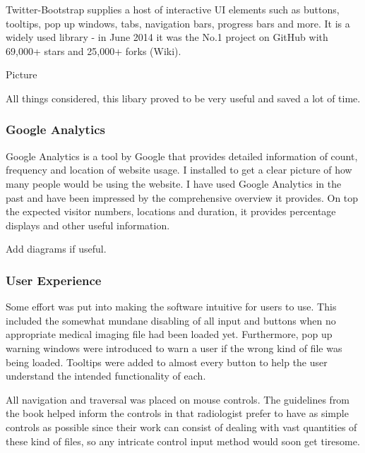 \documentclass[a4paper,11pt,titlepage]{article}
\begin{document}
Twitter-Bootstrap supplies a host of interactive UI elements such as buttons, tooltips, pop up windows, tabs, navigation bars, progress bars and more. It is a widely used library - in June 2014 it was the No.1 project on GitHub with 69,000+ stars and 25,000+ forks (Wiki).


Picture



All things considered, this libary proved to be very useful and saved a lot of time.




\subsubsection{Google Analytics}

Google Analytics is a tool by Google that provides detailed information of count, frequency and location of website usage. I installed to get a clear picture of how many people would be using the website. I have used Google Analytics in the past and have been impressed by the comprehensive overview it provides. On top the expected visitor numbers, locations and duration, it provides percentage displays and other useful information.

Add diagrams if useful.





\subsubsection{User Experience}

Some effort was put into making the software intuitive for users to use.
This included the somewhat mundane disabling of all input and buttons when no appropriate medical imaging file had been loaded yet. Furthermore, pop up warning windows were introduced to warn a user if the wrong kind of file was being loaded. Tooltips were added to almost every button to help the user understand the intended functionality of each.

All navigation and traversal was placed on mouse controls. The guidelines from the book helped inform the controls in that radiologist prefer to have as simple controls as possible since their work can consist of dealing with vast quantities of these kind of files, so any intricate control input method would soon get tiresome.
\end{document}

